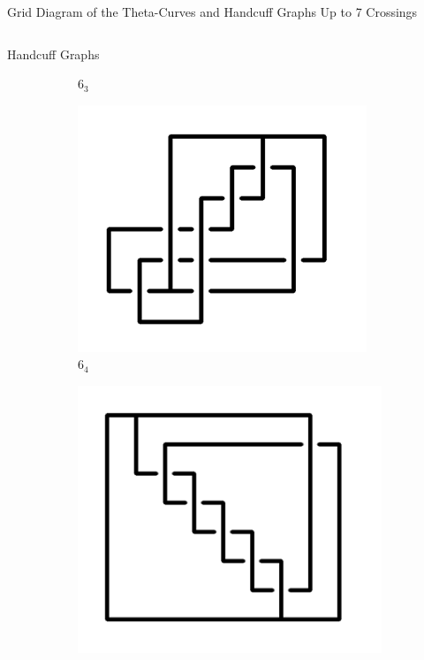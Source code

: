 \documentclass[final]{beamer}
\begin{document}
\begin{frame}[t]
\begin{alertblock}{Grid Diagram of the Theta-Curves and Handcuff Graphs Up to 7 Crossings}
\begin{columns}[t]
\begin{column}{0.5\textwidth}
\begin{alertblock}{Handcuff Graphs}
\begin{figure}
\begin{subfigure}{0.075\textwidth}
    \caption{$6_{3}$} 
    \end{subfigure}
    \begin{subfigure}{0.075\textwidth}
    \includegraphics[width=\columnwidth]{../Midterm_Poster/grid_diagram/handcuff_6_4.png}
    \caption{$6_{4}$} 
    \end{subfigure}
    \begin{subfigure}{0.075\textwidth}
    \includegraphics[width=\columnwidth]{../Midterm_Poster/grid_diagram/handcuff_6_5.png}

\end{subfigure}
\end{figure}
\end{alertblock}
\end{column}
\end{columns}
\end{alertblock}
\end{frame}
\end{document}
